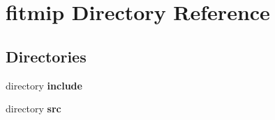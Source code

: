 \section{fitmip Directory Reference}
\label{dir_cf72b912961b47d6cc786cac8e0dc9fc}
\subsection*{Directories}
\begin{DoxyCompactItemize}
\item 
directory {\bf include}
\item 
directory {\bf src}
\end{DoxyCompactItemize}

